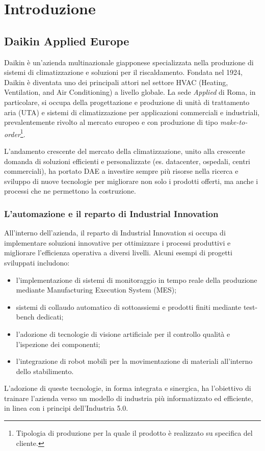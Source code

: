 \chapter{Introduzione}
\section{Daikin Applied Europe}
Daikin è un'azienda multinazionale giapponese specializzata nella produzione di sistemi di climatizzazione e soluzioni per il riscaldamento. Fondata nel 1924, Daikin è diventata uno dei principali attori nel settore HVAC (Heating, Ventilation, and Air Conditioning) a livello globale. La sede \textit{Applied} di Roma, in particolare, si occupa della progettazione e produzione di unità di trattamento aria (UTA) e sistemi di climatizzazione per applicazioni commerciali e industriali, prevalentemente rivolto al mercato europeo e con produzione di tipo \textit{make-to-order}\footnote{Tipologia di produzione per la quale il prodotto è realizzato su specifica del cliente.}.

L'andamento crescente del mercato della climatizzazione, unito alla crescente domanda di soluzioni efficienti e personalizzate (es. datacenter, ospedali, centri commerciali), ha portato DAE a investire sempre più risorse nella ricerca e sviluppo di nuove tecnologie per migliorare non solo i prodotti offerti, ma anche i processi che ne permettono la costruzione.

\subsection{L'automazione e il reparto di Industrial Innovation}
All'interno dell'azienda, il reparto di Industrial Innovation si occupa di implementare soluzioni innovative per ottimizzare i processi produttivi e migliorare l'efficienza operativa a diversi livelli. Alcuni esempi di progetti sviluppati includono:
\begin{itemize}
    \item l'implementazione di sistemi di monitoraggio in tempo reale della produzione mediante Manufacturing Execution System (MES);
    \item sistemi di collaudo automatico di sottoassiemi e prodotti finiti mediante test-bench dedicati;
    \item l'adozione di tecnologie di visione artificiale per il controllo qualità e l'ispezione dei componenti;
    \item l'integrazione di robot mobili per la movimentazione di materiali all'interno dello stabilimento.
\end{itemize}
L'adozione di queste tecnologie, in forma integrata e sinergica, ha l'obiettivo di trainare l'azienda verso un modello di industria più informatizzato ed efficiente, in linea con i principi dell'Industria 5.0.
